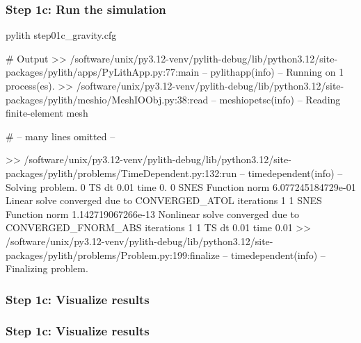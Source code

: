 \documentclass[aspectratio=169]{beamer}
\begin{document}
\begin{frame}[fragile]
  \frametitle{Step 1c: Run the simulation}
  \summary{}

\begin{bashcode}
pylith step01c_gravity.cfg

# Output
 >> /software/unix/py3.12-venv/pylith-debug/lib/python3.12/site-packages/pylith/apps/PyLithApp.py:77:main
 -- pylithapp(info)
 -- Running on 1 process(es).
 >> /software/unix/py3.12-venv/pylith-debug/lib/python3.12/site-packages/pylith/meshio/MeshIOObj.py:38:read
 -- meshiopetsc(info)
 -- Reading finite-element mesh

# -- many lines omitted --

 >> /software/unix/py3.12-venv/pylith-debug/lib/python3.12/site-packages/pylith/problems/TimeDependent.py:132:run
 -- timedependent(info)
 -- Solving problem.
0 TS dt 0.01 time 0.
    0 SNES Function norm 6.077245184729e-01
      Linear solve converged due to CONVERGED_ATOL iterations 1
    1 SNES Function norm 1.142719067266e-13
    Nonlinear solve converged due to CONVERGED_FNORM_ABS iterations 1
1 TS dt 0.01 time 0.01
 >> /software/unix/py3.12-venv/pylith-debug/lib/python3.12/site-packages/pylith/problems/Problem.py:199:finalize
 -- timedependent(info)
 -- Finalizing problem.
\end{bashcode}
  
\end{frame}



\begin{frame}
  \frametitle{Step 1c: Visualize results}

    
\end{frame}


\begin{frame}
  \frametitle{Step 1c: Visualize results}

    
\end{frame}
\end{document}
